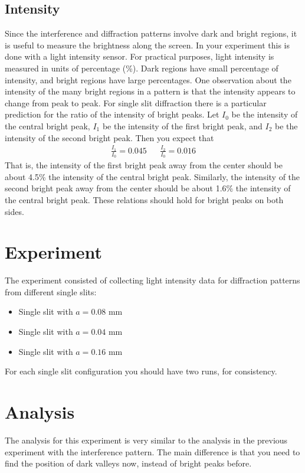 \subsection{Intensity}
%
Since the interference and diffraction patterns involve dark and bright regions, it is useful to measure the brightness along the screen. In your experiment this is done with a light intensity sensor. For practical purposes, light intensity is measured in units of percentage (\%). Dark regions have small percentage of intensity, and bright regions have large percentages. One observation about the intensity of the many bright regions in a pattern is that the intensity appears to change from peak to peak. For single slit diffraction there is a particular prediction for the ratio of the intensity of bright peaks. Let $I_{0}$ be the intensity of the central bright peak, $I_{1}$ be the intensity of the first bright peak, and $I_{2}$ be the intensity of the second bright peak. Then you expect that
\begin{align}
    \frac{I_{1}}{I_{0}} = 0.045 && \frac{I_{2}}{I_{0}} = 0.016
\end{align}
That is, the intensity of the first bright peak away from the center should be about 4.5\% the intensity of the central bright peak. Similarly, the intensity of the second bright peak away from the center should be about 1.6\% the intensity of the central bright peak. These relations should hold for bright peaks on both sides.
%
\section{Experiment}
%
The experiment consisted of collecting light intensity data for diffraction patterns from different single slits:
\begin{itemize}
    \item Single slit with $a = 0.08$ mm
    \item Single slit with $a = 0.04$ mm
    \item Single slit with $a = 0.16$ mm
\end{itemize}
For each single slit configuration you should have two runs, for consistency.
%
\section{Analysis}
%
The analysis for this experiment is very similar to the analysis in the previous experiment with the interference pattern. The main difference is that you need to find the position of dark valleys now, instead of bright peaks before.
%
